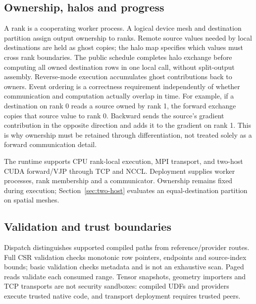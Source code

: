 \subsection{Ownership, halos and progress}
A rank is a cooperating worker process. A logical device mesh and destination
partition assign output ownership to ranks. Remote source values needed by local
destinations are held as ghost copies; the halo map specifies which values must
cross rank boundaries. The public schedule completes halo exchange before computing all owned
destination rows in one local call, without split-output assembly.
Reverse-mode execution accumulates ghost contributions back
to owners. Event ordering is a correctness requirement independently of whether
communication and computation actually overlap in time.
For example, if a destination on rank 0 reads a source owned by rank 1, the
forward exchange copies that source value to rank 0. Backward sends the source's
gradient contribution in the opposite direction and adds it to the gradient on
rank 1. This is why ownership must be retained through differentiation, not
treated solely as a forward communication detail.

The runtime supports CPU rank-local execution, MPI transport, and two-host CUDA
forward/VJP through TCP and NCCL. Deployment supplies worker processes, rank
membership and a communicator. Ownership remains fixed during execution;
Section~\ref{sec:two-host} evaluates an equal-destination partition on spatial meshes.

\subsection{Validation and trust boundaries}
Dispatch distinguishes supported compiled paths from reference/provider routes.
Full CSR validation checks monotonic row pointers, endpoints and source-index
bounds; basic validation checks metadata and is not an exhaustive scan.
Paged reads validate each consumed range. Tensor snapshots, geometry importers
and TCP transports are not security sandboxes: compiled UDFs and providers
execute trusted native code, and transport deployment requires trusted peers.
\FloatBarrier
